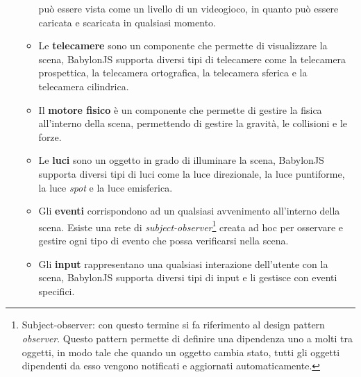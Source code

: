 \begin{itemize}
\begin{itemize}
        può essere vista come un livello di un videogioco, in quanto può essere caricata e scaricata in qualsiasi momento.
        \item Le \textbf{telecamere} sono un componente che permette di visualizzare la scena, BabylonJS supporta diversi tipi di telecamere come la telecamera prospettica, la telecamera ortografica,
        la telecamera sferica e la telecamera cilindrica.
        \item Il \textbf{motore fisico} è un componente che permette di gestire la fisica all'interno della scena, permettendo di gestire la gravità, le collisioni e le forze.
        \item Le \textbf{luci} sono un oggetto in grado di illuminare la scena, BabylonJS supporta diversi tipi di luci come la luce direzionale, la luce puntiforme, la luce 
        \textit{spot} e la luce emisferica.
        \item Gli \textbf{eventi} corrispondono ad un qualsiasi avvenimento all'interno della scena. Esiste una rete di \textit{subject-observer}\footnote{
            Subject-observer: con questo termine si fa riferimento al design pattern \textit{observer}. Questo pattern permette di definire una dipendenza uno a molti tra oggetti,
            in modo tale che quando un oggetto cambia stato, tutti gli oggetti dipendenti da esso vengono notificati e aggiornati automaticamente.
        } creata ad hoc per osservare e gestire ogni tipo di evento che possa verificarsi nella scena.
        \item Gli \textbf{input} rappresentano una qualsiasi interazione dell'utente con la scena, BabylonJS supporta diversi tipi di input e li gestisce con eventi specifici.
    \end{itemize}
\end{itemize}

